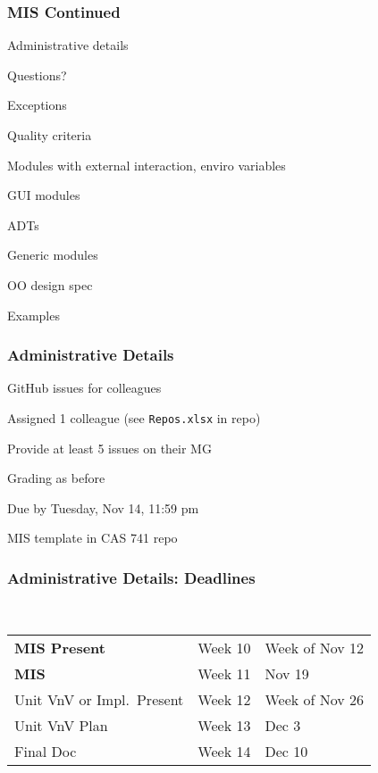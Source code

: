 \documentclass[t,12pt,numbers,fleqn]{beamer}
\begin{document}



\begin{frame}
\frametitle{MIS Continued}

\bi
\item Administrative details
\item Questions?
\item Exceptions
\item Quality criteria
\item Modules with external interaction, enviro variables
\item GUI modules
\item ADTs
\item Generic modules
\item OO design spec
\item Examples
\ei
\end{frame}


\begin{frame}
\frametitle{Administrative Details}

\bi
\item GitHub issues for colleagues
\bi
\item Assigned 1 colleague (see \texttt{Repos.xlsx} in repo)
\item Provide at least 5 issues on their MG
\item Grading as before
\item Due by Tuesday, Nov 14, 11:59 pm
\ei
\item MIS template in CAS 741 repo
\ei

\end{frame}


\begin{frame}
\frametitle{Administrative Details: Deadlines}
~\newline
\begin{tabular}{l l l}
\textbf{MIS Present} & Week 10 & Week of Nov 12\\
\textbf{MIS} & Week 11 & Nov 19\\
Unit VnV or Impl.\ Present & Week 12 & Week of Nov 26\\
Unit VnV Plan & Week 13 & Dec 3\\
Final Doc & Week 14 & Dec 10\\
\end {tabular}

\end{frame}
\end{document}
